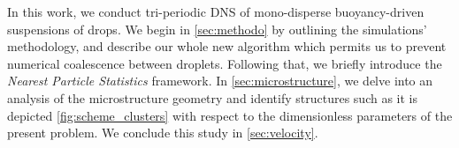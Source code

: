 In this work, we conduct tri-periodic DNS of mono-disperse buoyancy-driven suspensions of drops. 
We begin in \ref{sec:methodo} by outlining the simulations' methodology, and describe our whole new algorithm which permits us to prevent numerical coalescence between droplets. 
Following that, we briefly introduce the \textit{Nearest Particle Statistics} framework. 
In \ref{sec:microstructure}, we delve into an analysis of the microstructure geometry and identify structures such as it is depicted \ref{fig:scheme_clusters} with respect to the dimensionless parameters of the present problem. 
We conclude this study in \ref{sec:velocity}. %
 
